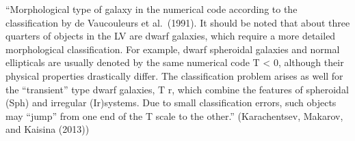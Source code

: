 \documentclass[
]{article}
\begin{document}
``Morphological type of galaxy in the numerical code according to the
classification by de Vaucouleurs et al.~(1991). It should be noted that
about three quarters of objects in the LV are dwarf galaxies, which
require a more detailed morphological classification. For example, dwarf
spheroidal galaxies and normal ellipticals are usually denoted by the
same numerical code T \textless{} 0, although their physical properties
drastically differ. The classification problem arises as well for the
``transient'' type dwarf galaxies, T r, which combine the features of
spheroidal (Sph) and irregular (Ir)systems. Due to small classification
errors, such objects may ``jump'' from one end of the T scale to the
other.'' (Karachentsev, Makarov, and Kaisina (2013))

\begin{figure}

\begin{minipage}{0.50\linewidth}



\end{minipage}%
%
\begin{minipage}{0.50\linewidth}

\end{minipage}
\end{figure}
\end{document}
